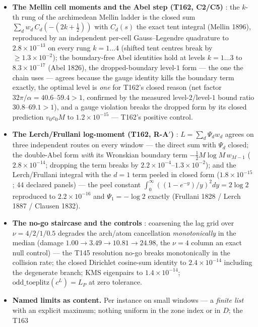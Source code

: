 \documentclass[11pt,a4paper]{article}
\begin{document}
\begin{itemize}[leftmargin=1.5em]
coordinates on every window (the knob curve \emph{is} the Pareto front). Mutation: a
corrupted off-diagonal sixteen-block entry makes the Cholesky \emph{refuse} on $12/12$.
\item \textbf{The Mellin cell moments and the Abel step (T162, C2/C5)} \mE: the $k$-th
rung of the archimedean Mellin ladder is the closed sum $\sum_dw_d\,C_d(-(2k+\tfrac12))$
with $C_d(s)$ the exact tent integral (Mellin 1896), reproduced by an independent
per-cell Gauss--Legendre quadrature to $2.8\times10^{-13}$ on every rung $k=1\ldots4$
(shifted tent centres break by $\ge1.3\times10^{-2}$); the boundary-free Abel identities
hold at levels $k=1\ldots3$ to $8.3\times10^{-17}$ (Abel 1826), the dropped-boundary
level-$1$ form --- the one the chain uses --- agrees because the gauge identity kills the
boundary term exactly, the optimal level is \emph{one} for T162's closed reason (net
factor $32\pi/\alpha=40.6$--$59.4>1$, confirmed by the measured level-$2$/level-$1$
bound ratio $30.8$--$69.1>1$), and a gauge violation breaks the dropped form by its
closed prediction $v_0c_0M$ to $1.2\times10^{-15}$ --- T162's positive control.
\item \textbf{The Lerch/Frullani log-moment (T162, R-A$'$)} \mE: $L=\sum_d\Psi_dw_d$
agrees on three independent routes on every window --- the direct sum with $\Psi_d$
closed; the double-Abel form \emph{with} its Wronskian boundary term
$-\tfrac12M\log M\,w_{M-1}$ ($2.8\times10^{-14}$; dropping the term breaks by
$2.2\times10^{-4}$--$1.3\times10^{-2}$); and the Lerch/Frullani integral with the $d=1$
term peeled in closed form ($1.8\times10^{-15}$; $44$ declared panels) --- the peel
constant $\int_0^\infty((1-e^{-y})/y)^2dy=2\log2$ reproduced to $2.2\times10^{-16}$ and
$\Psi_1=-\log2$ exactly (Frullani 1828 / Lerch 1887 / Clausen 1832).
\item \textbf{The no-go staircase and the controls} \mE: coarsening the lag grid over
$\nu=4/2/1/0.5$ degrades the arch/atom cancellation \emph{monotonically} in the median
(damage $1.00\to3.49\to10.81\to24.98$, the $\nu=4$ column an exact null control) --- the
T145 resolution no-go breaks monotonically in the collision rate; the closed Dirichlet
cosine-sum identity to $2.4\times10^{-14}$ including the degenerate branch; KMS
eigenpairs to $1.4\times10^{-14}$; $\mathrm{odd\_toeplitz}(c^L)=L_P$ at zero tolerance.
\item \textbf{Named limits as content.} Per instance on small windows --- a \emph{finite
list} with an explicit maximum; nothing uniform in the zone index or in $D$; the T163

\end{itemize}
\end{document}
